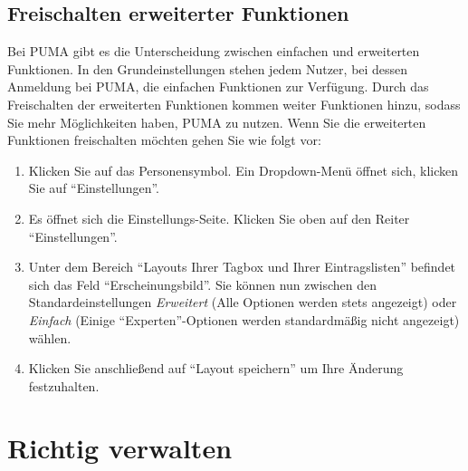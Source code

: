 \documentclass[a4paper,11pt,twoside]{scrbook}
\begin{document}
\subsection{Freischalten erweiterter Funktionen}
Bei PUMA gibt es die Unterscheidung zwischen einfachen und erweiterten Funktionen. In den Grundeinstellungen stehen jedem Nutzer, bei dessen Anmeldung bei PUMA, die einfachen Funktionen zur Verfügung. Durch das Freischalten der erweiterten Funktionen kommen weiter Funktionen hinzu, sodass Sie mehr Möglichkeiten haben, PUMA zu nutzen.  Wenn Sie die erweiterten Funktionen freischalten möchten gehen Sie wie folgt vor:
\begin{enumerate}
    \item Klicken Sie auf das Personensymbol. Ein Dropdown-Menü öffnet sich, klicken Sie auf \enquote{Einstellungen}.
    \item Es öffnet sich die Einstellungs-Seite. Klicken Sie oben auf den Reiter \enquote{Einstellungen}.
    \item Unter dem Bereich \enquote{Layouts Ihrer Tagbox und Ihrer Eintragslisten} befindet sich das Feld \enquote{Erscheinungsbild}. Sie können nun zwischen den Standardeinstellungen \textit{Erweitert} (Alle Optionen werden stets angezeigt) oder \textit{Einfach} (Einige \enquote{Experten}-Optionen werden standardmäßig nicht angezeigt) wählen.
    \item Klicken Sie anschließend auf \enquote{Layout speichern} um Ihre Änderung festzuhalten.
\end{enumerate}
\newpage
\section{Richtig verwalten}
\end{document}
